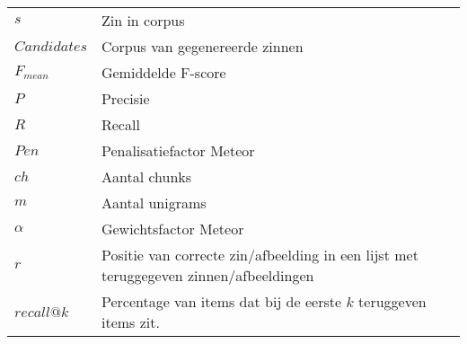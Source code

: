 \documentclass[master=cws,masteroption=ai]{kulemt}
\begin{document}
		\begin{flushleft}
			\renewcommand{\arraystretch}{1.1}
			\begin{tabularx}{\textwidth}{@{}p{25mm}X@{}}
	$s$			& Zin in corpus\\
	$Candidates$        & Corpus van gegenereerde zinnen\\
	$F_{mean}$  & Gemiddelde F-score\\
	$P$			& Precisie\\
	$R$			& Recall\\
	$Pen$		& Penalisatiefactor Meteor\\
	$ch$		& Aantal chunks\\
	$m$			& Aantal unigrams\\
	$\alpha$	& Gewichtsfactor Meteor\\
	$r$			& Positie van correcte zin/afbeelding in een lijst met teruggegeven zinnen/afbeeldingen\\
	$recall@k$	& Percentage van items dat bij de eerste $k$ teruggeven items zit.\\
  \end{tabularx}
\end{flushleft}

\mainmatter











\appendixpage*          %
\appendix



\backmatter


\end{document}
